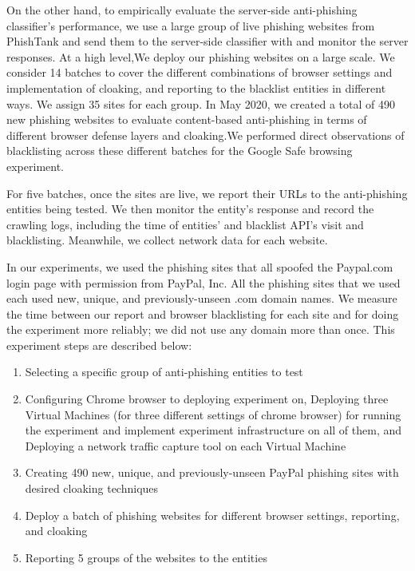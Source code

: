 \documentclass[letterpaper,twocolumn,10pt]{article}
\begin{document}
On the other hand, to empirically evaluate the server-side anti-phishing classifier's performance, we use a large group of live phishing websites from PhishTank and send them to the server-side classifier with and monitor the server responses.
At a high level,We deploy our phishing websites on a large scale. 
We consider 14 batches to cover the different combinations of browser settings and implementation of cloaking, and reporting to the blacklist entities in different ways. We assign 35 sites for each group. In May 2020, we created a total of 490 new phishing websites to evaluate content-based anti-phishing in terms of different browser defense layers and cloaking.We performed direct observations of blacklisting across these different batches for the Google Safe browsing experiment. 

For five batches, once the sites are live, we report their URLs to the anti-phishing entities being tested. We then monitor the entity's response and record the crawling logs, including the time of entities' and blacklist API's visit and blacklisting. Meanwhile, we collect network data for each website.

In our experiments, we used the phishing sites that all spoofed the Paypal.com login page with permission from PayPal, Inc. All the phishing sites that we used each used new, unique, and previously-unseen .com domain names. We measure the time between our report and browser blacklisting for each site and for doing the experiment more reliably; we did not use any domain more than once.  
This experiment steps are described below:  


\begin{enumerate}
    \item Selecting a specific group of anti-phishing entities to test
    \item Configuring Chrome browser to deploying experiment on, Deploying three Virtual Machines (for three different settings of chrome browser) for running the experiment and implement experiment infrastructure on all of them, and Deploying a network traffic capture tool on each Virtual Machine
    \item Creating 490 new, unique, and previously-unseen PayPal phishing sites with desired cloaking techniques
    \item Deploy a batch of phishing websites for different browser settings, reporting, and cloaking
    \item Reporting 5 groups of the websites to the entities
    
\end{enumerate}
\end{document}
